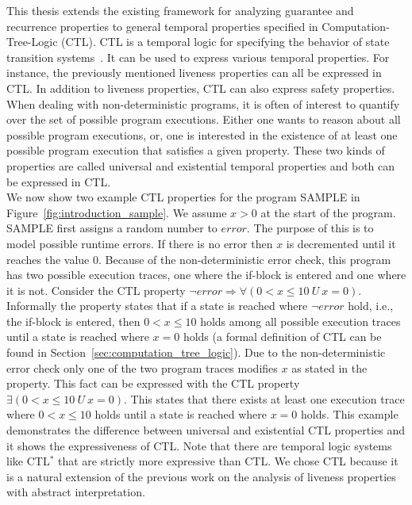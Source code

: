 \documentclass[11pt,a4paper,titlepage]{article}
\theoremstyle{definition}
\begin{document}
This thesis extends the existing framework for analyzing guarantee and recurrence properties to 
general temporal properties specified in Computation-Tree-Logic (CTL).
CTL is a temporal logic for specifying the behavior of state transition systems~\cite{baier2008principles}. 
It can be used to express various temporal properties. For instance, the previously mentioned liveness properties can all be expressed in CTL. 
In addition to liveness properties, CTL can also express safety properties.\\

When dealing with non-deterministic programs, it is often of interest to quantify over the set of possible program executions. 
Either one wants to reason about all possible program executions, or, one is interested in the existence 
of at least one possible program execution that satisfies a given property. 
These two kinds of properties are called universal and existential temporal properties and both can be expressed in CTL.\\

We now show two example CTL properties for the program \textsf{SAMPLE} in Figure~\ref{fig:introduction_sample}. 
We assume $x>0$ at the start of the program. \textsf{SAMPLE} first assigns a random number to $error$. 
The purpose of this is to model possible runtime errors. 
If there is no error then $x$ is decremented until it reaches the value $0$.
Because of the non-deterministic error check, this program has two possible execution traces, one where the if-block is entered and one
where it is not. Consider the CTL property $\neg error \Rightarrow \forall(0 < x \leq 10 \ U \ x = 0)$. 
Informally the property states that if a state is reached where $\neg error$ hold, i.e., the
if-block is entered, then $0 < x \leq 10$ holds among all possible execution traces until a state is reached where $x=0$ holds
(a formal definition of CTL can be found in Section~\ref{sec:computation_tree_logic}). Due to the non-deterministic error check only one of the
two program traces modifies $x$ as stated in the property. 
This fact can be expressed with the CTL property $\exists(0 < x \leq 10 \ U \ x = 0)$. This states that there exists at least one execution trace
where $0 < x \leq 10$ holds until a state is reached where $x = 0$ holds. This example demonstrates the difference between universal and existential 
CTL properties and it shows the expressiveness of CTL. Note that there are temporal logic systems like CTL$^{*}$
that are strictly more expressive than CTL. We chose CTL because it is a natural extension of 
the previous work on the analysis of liveness properties with abstract interpretation.\\
\end{document}
